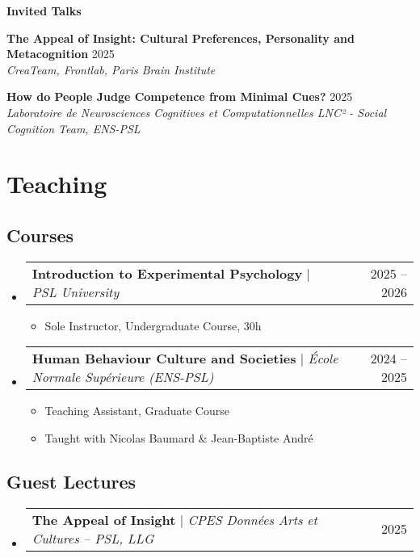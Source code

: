 \documentclass[letterpaper,11pt]{article}
\makeatletter
\newcommand{\resumeItem}[1]{
  \item\small{
    {#1 \vspace{-2pt}}
  }
}
\newcommand{\resumeItemWithYear}[3][ ]{ %
  \item\small{
    #2 \hfill {\small #3} \\
    #1
  }
}
\newcommand{\resumePublicationHeading}[1]{
  \vspace{5pt} %
  \noindent\textbf{\small #1} %
  \vspace{2pt} %
}
\newcommand{\resumeProjectHeading}[2]{
    \item
    \begin{tabular*}{0.97\textwidth}{l@{\extracolsep{\fill}}r}
      \small#1 & #2 \\
    \end{tabular*}\vspace{-7pt}
}
\newcommand{\resumeSubHeadingListStart}{\begin{itemize}[leftmargin=0.15in, label={}]}
\newcommand{\resumeSubHeadingListEnd}{\end{itemize}}
\newcommand{\resumeItemListStart}{\begin{itemize}}
\newcommand{\resumeItemListEnd}{\end{itemize}\vspace{-5pt}}
\makeatother
\begin{document}
\resumePublicationHeading{Invited Talks}
\begin{etaremune}
  \resumeItemWithYear{\textbf{The Appeal of Insight: Cultural Preferences, Personality and Metacognition}}{2025}{\textit{CreaTeam, Frontlab, Paris Brain Institute}}
  \resumeItemWithYear{\textbf{How do People Judge Competence from Minimal Cues?}}{2025}{\textit{Laboratoire de Neurosciences Cognitives et Computationnelles LNC² - Social Cognition Team, ENS-PSL}}
\end{etaremune}

\section{Teaching}

\subsection*{Courses}
    \resumeSubHeadingListStart
    \resumeProjectHeading
        {\textbf{Introduction to Experimental Psychology} $|$ \emph{PSL University}}{2025 -- 2026}
        \resumeItemListStart
          \resumeItem{Sole Instructor, Undergraduate Course, 30h}
        \resumeItemListEnd
    \resumeSubHeadingListEnd
    \resumeSubHeadingListStart
      \resumeProjectHeading
          {\textbf{Human Behaviour Culture and Societies} $|$ \emph{École Normale Supérieure (ENS-PSL)}}{2024 -- 2025}
          \resumeItemListStart
            \resumeItem{Teaching Assistant, Graduate Course}
            \resumeItem{Taught with Nicolas Baumard \& Jean-Baptiste André}
          \resumeItemListEnd
    \resumeSubHeadingListEnd

\subsection*{Guest Lectures}
    \resumeSubHeadingListStart
    \resumeProjectHeading
        {\textbf{The Appeal of Insight} $|$ \emph{CPES Données Arts et Cultures -- PSL, LLG}}{2025}
    \resumeSubHeadingListEnd

\end{document}
